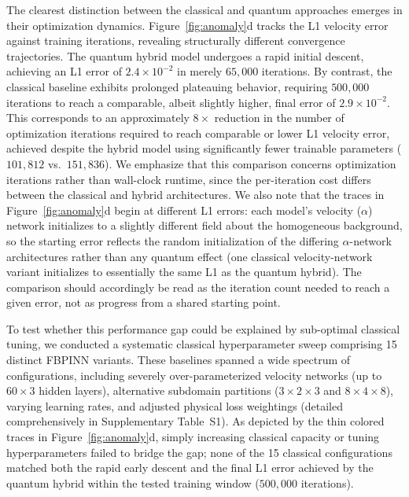 \documentclass[11pt,a4paper]{article}
\begin{document}
The clearest distinction between the classical and quantum approaches emerges in their optimization dynamics. Figure~\ref{fig:anomaly}d tracks the L1 velocity error against training iterations, revealing structurally different convergence trajectories. The quantum hybrid model undergoes a rapid initial descent, achieving an L1 error of $2.4\times 10^{-2}$ in merely $65{,}000$ iterations. By contrast, the classical baseline exhibits prolonged plateauing behavior, requiring $500{,}000$ iterations to reach a comparable, albeit slightly higher, final error of $2.9\times 10^{-2}$. This corresponds to an approximately $8\times$ reduction in the number of optimization iterations required to reach comparable or lower L1 velocity error, achieved despite the hybrid model using significantly fewer trainable parameters ($101{,}812$ vs.\ $151{,}836$). We emphasize that this comparison concerns optimization iterations rather than wall-clock runtime, since the per-iteration cost differs between the classical and hybrid architectures. We also note that the traces in Figure~\ref{fig:anomaly}d begin at different L1 errors: each model's velocity ($\alpha$) network initializes to a slightly different field about the homogeneous background, so the starting error reflects the random initialization of the differing $\alpha$-network architectures rather than any quantum effect (one classical velocity-network variant initializes to essentially the same L1 as the quantum hybrid). The comparison should accordingly be read as the iteration count needed to reach a given error, not as progress from a shared starting point.

To test whether this performance gap could be explained by sub-optimal classical tuning, we conducted a systematic classical hyperparameter sweep comprising 15 distinct FBPINN variants. These baselines spanned a wide spectrum of configurations, including severely over-parameterized velocity networks (up to $60\!\times\!3$ hidden layers), alternative subdomain partitions ($3\!\times\!2\!\times\!3$ and $8\!\times\!4\!\times\!8$), varying learning rates, and adjusted physical loss weightings (detailed comprehensively in Supplementary Table~S1). As depicted by the thin colored traces in Figure~\ref{fig:anomaly}d, simply increasing classical capacity or tuning hyperparameters failed to bridge the gap; none of the 15 classical configurations matched both the rapid early descent and the final L1 error achieved by the quantum hybrid within the tested training window ($500{,}000$ iterations).
\end{document}
